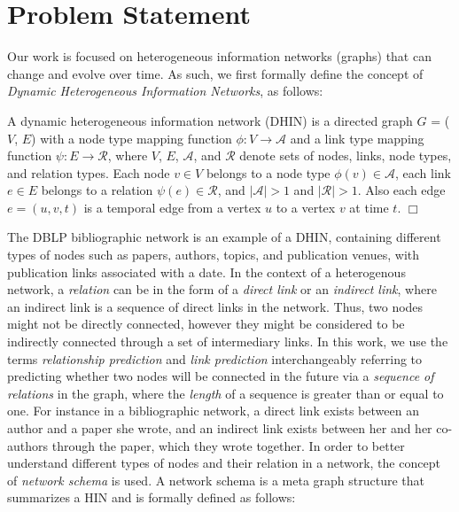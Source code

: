 \section{Problem Statement}


Our work is focused on heterogeneous information networks (graphs) that can change and evolve over time. As such, we first formally define the concept of \textit{Dynamic Heterogeneous Information Networks}, as follows:


\begin{definition} A dynamic heterogeneous information network (DHIN) is a directed graph $G$ = ($V$, $E$) with a node type mapping function $\phi: V \rightarrow \mathcal{A}$ and a link type mapping function $\psi: E \rightarrow \mathcal{R}$, where $V$, $E$, $\mathcal{A}$, and $\mathcal{R}$ denote sets of nodes, links, node types, and relation types. Each node $v \in V$ belongs to a node type $\phi(v) \in \mathcal{A}$, each link $e \in E$ belongs to a relation $\psi(e) \in \mathcal{R}$, and $|\mathcal{A}| > 1$ and $|\mathcal{R}| > 1$. Also each edge $e = (u, v, t)$ is a temporal edge from a vertex $u$ to a vertex $v$ at time $t$. $\Box$ \end{definition}

The DBLP bibliographic network%
is an example of a DHIN, containing different types of nodes such as papers, authors, topics, and publication venues, with publication links associated with a date. %
In the context of a heterogenous network, a \textit{relation} can be in the form of a \textit{direct link} or an \textit{indirect link}, where an indirect link is a sequence of direct links in the network. Thus, two nodes might not be directly connected, however they might be considered to be indirectly connected through a set of intermediary links. In this work, we use the terms \textit{relationship prediction} and \textit{link prediction} interchangeably referring to predicting whether two nodes will be connected in the future via a \textit{sequence of relations} in the graph, where the \textit{length} of a sequence is greater than or equal to one. For instance in a bibliographic network, a direct link exists between an author and a paper she wrote, and an indirect link exists between her and her co-authors through the paper, which they wrote together. In order to better understand different types of nodes and their relation in a network, the concept of \textit{network schema} \cite{sun2011pathsim} is used. A network schema is a meta graph structure that summarizes a HIN and is formally defined as follows:

